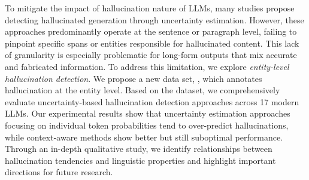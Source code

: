 To mitigate the impact of hallucination nature of LLMs, many studies propose detecting hallucinated generation through uncertainty estimation. However, these approaches predominantly operate at the sentence or paragraph level, failing to pinpoint specific spans or entities responsible for hallucinated content. This lack of granularity is especially problematic for long-form outputs that mix accurate and fabricated information. To address this limitation, we explore \emph{entity-level hallucination detection}. We propose a new data set, \dataset, which annotates hallucination at the entity level. Based on the dataset, we comprehensively evaluate uncertainty-based hallucination detection approaches across 17 modern LLMs. Our experimental results show that uncertainty estimation approaches focusing on individual token probabilities tend to over-predict hallucinations, while context-aware methods show better but still suboptimal performance. Through an in-depth qualitative study, we identify relationships between hallucination tendencies and linguistic properties and highlight important directions for future research.